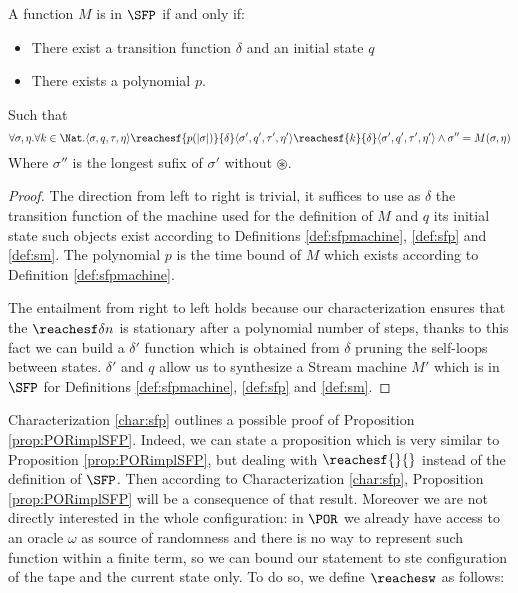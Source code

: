 \begin{conditional}{\notappendix}
  \begin{characterization}
    \label{char:sfp}
    A function $M$ is in $\SFP$ if and only if:
    \begin{itemize}
      \item There exist a transition function $\delta$ and an initial state $q$
      \item There exists a polynomial $p$.
    \end{itemize}
    Such that
    \[
    \forall \sigma, \eta. \forall k \in \Nat. \langle \sigma,q,\tau, \eta\rangle {\reachesf {p(|\sigma|)} {\delta}} \langle \sigma',q',\tau', \eta'\rangle {\reachesf {k} {\delta}} \langle \sigma',q',\tau', \eta'\rangle\land \sigma''=M(\sigma, \eta)
    \]
    Where $\sigma''$ is the longest sufix of $\sigma'$ without $\circledast$.
  \end{characterization}
  \begin{proof}
    The direction from left to right is trivial, it suffices to use as $\delta$
    the transition function of the machine used for the definition of $M$
    and $q$ its initial state such objects exist according to Definitions
    \ref{def:sfpmachine}, \ref{def:sfp} and \ref{def:sm}.
    The polynomial $p$ is the time bound of $M$ which
    exists according to Definition \ref{def:sfpmachine}.

    The entailment from right to left holds because our characterization
    ensures that the $\reachesf \delta n$ is stationary after a polynomial number of steps,
    thanks to this fact we can build a $\delta'$ function which is obtained
    from $\delta$ pruning the self-loops between states.
    $\delta'$ and $q$ allow us to synthesize a Stream machine $M'$ which is in
    $\SFP$ for Definitions \ref{def:sfpmachine}, \ref{def:sfp} and \ref{def:sm}.
  \end{proof}

  Characterization \ref{char:sfp} outlines a possible proof of
  Proposition \ref{prop:PORimplSFP}.
  Indeed, we can state a proposition which is very similar
  to Proposition \ref{prop:PORimplSFP}, but dealing with $\reachesf {}{}$ instead of
  the definition of $\SFP$. Then according to Characterization \ref{char:sfp},
  Proposition \ref{prop:PORimplSFP} will be a consequence of that result.
  Moreover we are not directly interested in the whole configuration: in $\POR$
  we already have access to an oracle $\omega$ as source of randomness and there
  is no way to represent such function within a finite term, so
  we can bound our statement to ste configuration of the tape and the
  current state only. To do so, we define $\reachesw$ as follows:


\end{conditional}
